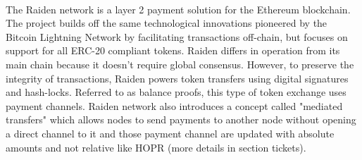 \\The Raiden network is a layer 2 payment solution for the Ethereum blockchain. The project builds off the same technological innovations pioneered by the Bitcoin Lightning Network by facilitating transactions off-chain, but focuses on support for all ERC-20 compliant tokens. Raiden differs in operation from its main chain because it doesn’t require global consensus. However, to preserve the integrity of transactions, Raiden powers token transfers using digital signatures and hash-locks. Referred to as balance proofs, this type of token exchange uses payment channels. Raiden network also introduces a concept called "mediated transfers" which allows nodes to send payments to another node without opening a direct channel to it and those payment channel are updated with absolute amounts and not relative like HOPR (more details in section tickets).
